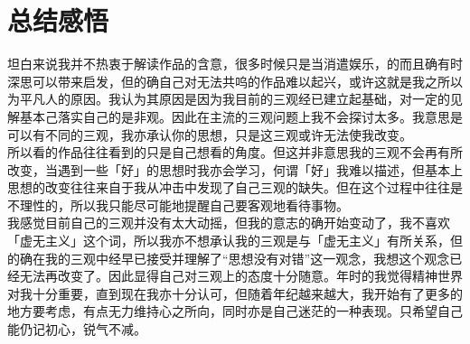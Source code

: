 \documentclass[supercite]{Experimental_Report}
\theoremstyle{definition}
\begin{document}
\section{总结感悟}

坦白来说我并不热衷于解读作品的含意，很多时候只是当消遣娱乐，的而且确有时深思可以带来启发，但的确自己对无法共呜的作品难以起兴，或许这就是我之所以为平凡人的原因。我认为其原因是因为我目前的三观经已建立起基础，对一定的见解基本己落实自己的是非观。因此在主流的三观问题上我不会探讨太多。我意思是可以有不同的三观，我亦承认你的思想，只是这三观或许无法使我改变。
\\所以看的作品往往看到的只是自己想看的角度。但这并非意思我的三观不会再有所改变，当遇到一些「好」的思想时我亦会学习，何谓「好」我难以描述，但基本上思想的改变往往来自于我从冲击中发现了自己三观的缺失。但在这个过程中往往是不理性的，所以我只能尽可能地提醒自己要客观地看待事物。
\\我感觉目前自己的三观并没有太大动摇，但我的意志的确开始变动了，我不喜欢「虚无主义」这个词，所以我亦不想承认我的三观是与「虚无主义」有所关系，但的确在我的三观中经早已接受并理解了“思想没有对错”这一观念，我想这个观念已经无法再改变了。因此显得自己对三观上的态度十分随意。年时的我觉得精神世界对我十分重要，直到现在我亦十分认可，但随着年纪越来越大，我开始有了更多的地方要考虑，有点无力维持心之所向，同时亦是自己迷茫的一种表现。只希望自己能仍记初心，锐气不减。
\end{document}
